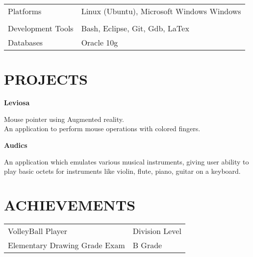 \documentclass{res}
\begin{document}
\begin{resume}
\begin{tabular}{l l}
		Platforms & Linux (Ubuntu), Microsoft \textsuperscript{\textregistered} Windows\textsuperscript{\textregistered} Windows\\\\

		Development Tools & Bash, Eclipse, Git, Gdb, LaTex\\

		Databases & Oracle\textsuperscript{\textregistered} 10g

	\end{tabular}      
           

\section{PROJECTS}
   \vspace{-0.1in}	
   \begin{tabbing}
		{\bf Leviosa}
   \end{tabbing}\vspace{-20pt}      %
    Mouse pointer using Augmented reality.\\An application to perform mouse operations with colored fingers.
   
   \begin{tabbing}
		{\bf Audics}
   \end{tabbing}\vspace{-20pt}
    An application which emulates various musical instruments, giving user ability to play basic octets for instruments like violin, flute, piano, guitar on a keyboard.
   
          
\section{ACHIEVEMENTS}

	\begin{tabular}{l l}

		{VolleyBall Player} & Division Level\\
		
		{Elementary Drawing Grade Exam} & B Grade\\
		

\end{tabular}
\end{resume}
\end{document}
